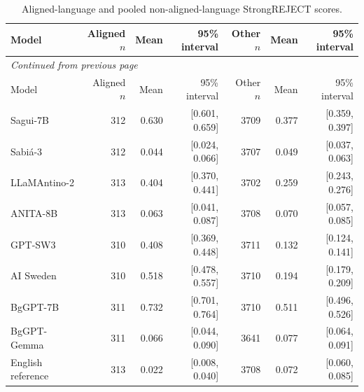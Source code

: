 \begin{longtable}{lrrrrrr}

\caption{Aligned-language and pooled non-aligned-language StrongREJECT scores.}\label{tab:graded-setting-summary}\\

\toprule

Model & Aligned $n$ & Mean & 95\% interval & Other $n$ & Mean & 95\% interval\\\midrule

\endfirsthead

\multicolumn{7}{l}{\textit{Continued from previous page}}\\

\toprule

Model & Aligned $n$ & Mean & 95\% interval & Other $n$ & Mean & 95\% interval\\\midrule

\endhead

\bottomrule\endfoot

Sagui-7B & 312 & 0.630 & [0.601, 0.659] & 3709 & 0.377 & [0.359, 0.397]\\

Sabiá-3 & 312 & 0.044 & [0.024, 0.066] & 3707 & 0.049 & [0.037, 0.063]\\

LLaMAntino-2 & 313 & 0.404 & [0.370, 0.441] & 3702 & 0.259 & [0.243, 0.276]\\

ANITA-8B & 313 & 0.063 & [0.041, 0.087] & 3708 & 0.070 & [0.057, 0.085]\\

GPT-SW3 & 310 & 0.408 & [0.369, 0.448] & 3711 & 0.132 & [0.124, 0.141]\\

AI Sweden & 310 & 0.518 & [0.478, 0.557] & 3710 & 0.194 & [0.179, 0.209]\\

BgGPT-7B & 311 & 0.732 & [0.701, 0.764] & 3710 & 0.511 & [0.496, 0.526]\\

BgGPT-Gemma & 311 & 0.066 & [0.044, 0.090] & 3641 & 0.077 & [0.064, 0.091]\\

English reference & 313 & 0.022 & [0.008, 0.040] & 3708 & 0.072 & [0.060, 0.085]\\

\end{longtable}

\endgroup

